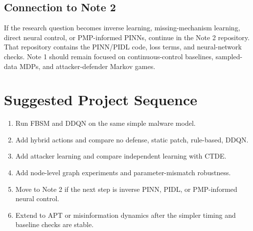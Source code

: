 \documentclass[11pt,a4paper]{article}
\begin{document}
\subsection{Connection to Note 2}
If the research question becomes inverse learning, missing-mechanism learning, direct neural control, or PMP-informed PINNs, continue in the Note 2 repository. That repository contains the PINN/PIDL code, loss terms, and neural-network checks. Note 1 should remain focused on continuous-control baselines, sampled-data MDPs, and attacker-defender Markov games.

\section{Suggested Project Sequence}
\begin{enumerate}
\item Run FBSM and DDQN on the same simple malware model.
\item Add hybrid actions and compare no defense, static patch, rule-based, DDQN.
\item Add attacker learning and compare independent learning with CTDE.
\item Add node-level graph experiments and parameter-mismatch robustness.
\item Move to Note 2 if the next step is inverse PINN, PIDL, or PMP-informed neural control.
\item Extend to APT or misinformation dynamics after the simpler timing and baseline checks are stable.
\end{enumerate}
\end{document}
